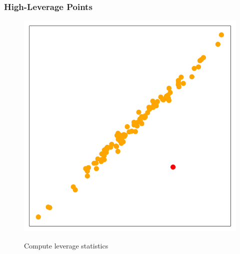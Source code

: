 \documentclass[serif, xcolor={dvipsnames}]{beamer} %
\begin{document}
\begin{frame}
\frametitle{High-Leverage Points}
\vspace{-.18in}
\begin{figure}[htbp]
\hspace{-.2in}
    \begin{minipage}{0.4\textwidth}
        \includegraphics[width=\linewidth]{high_leverage_point}
    \end{minipage}%
    \hspace{.2in}
    \begin{minipage}{0.5\textwidth}
       Compute leverage statistics
    \end{minipage}
\end{figure}

\end{frame}
\end{document}
